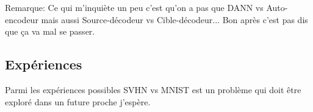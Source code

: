 Remarque:
Ce qui m'inquiète un peu c'est qu'on a pas que DANN vs Auto-encodeur
mais aussi Source-décodeur vs Cible-décodeur... Bon après c'est pas dis que ça
va mal se passer.

\subsection{Expériences} %
\label{sub:experiences}

Parmi les expériences possibles SVHN vs MNIST est un problème qui doit être
exploré dans un future proche j'espère.

